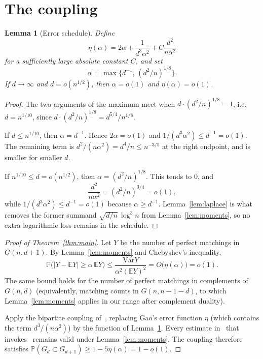 \documentclass[11pt]{article}
\newtheorem{lemma}[theorem]{Lemma}
\newcommand{\Gnd}{G(n,d)}
\newcommand{\EE}{\mathbb{E}}
\newcommand{\PP}{\mathbb{P}}
\newcommand{\Var}{\mathrm{Var}}
\begin{document}
\section{The coupling}
\label{sec:coupling}

\begin{lemma}[Error schedule]
\label{lem:eta}
Define
\[
\eta(\alpha)=2\alpha+\frac1{d^3\alpha^2}+C\frac{d^2}{n\alpha^2}
\]
for a sufficiently large absolute constant \(C\), and set
\[
\alpha=\max\bigl\{d^{-1},\,(d^2/n)^{1/8}\bigr\}.
\]
If \(d\to\infty\) and \(d=o(n^{1/2})\), then \(\alpha=o(1)\) and \(\eta(\alpha)=o(1)\).
\end{lemma}

\begin{proof}
The two arguments of the maximum meet when \(d\cdot(d^2/n)^{1/8}=1\), i.e.\ \(d=n^{1/10}\),
since \(d\cdot(d^2/n)^{1/8}=d^{5/4}/n^{1/8}\).

If \(d\le n^{1/10}\), then \(\alpha=d^{-1}\). Hence \(2\alpha=o(1)\) and
\(1/(d^3\alpha^2)\le d^{-1}=o(1)\). The remaining term is
\(d^2/(n\alpha^2)=d^4/n\le n^{-3/5}\) at the right endpoint, and is smaller for smaller \(d\).

If \(n^{1/10}\le d=o(n^{1/2})\), then \(\alpha=(d^2/n)^{1/8}\). This tends to \(0\), and
\[
\frac{d^2}{n\alpha^2}=(d^2/n)^{3/4}=o(1),
\]
while \(1/(d^3\alpha^2)\le d^{-1}=o(1)\) because \(\alpha\ge d^{-1}\).
Lemma~\ref{lem:laplace} is what removes the former summand \(\sqrt{d/n}\,\log^3 n\) from
Lemma~\ref{lem:moments}, so no extra logarithmic loss remains in the schedule.
\end{proof}

\begin{proof}[Proof of Theorem~\ref{thm:main}]
Let \(Y\) be the number of perfect matchings in \(G(n,d+1)\).
By Lemma~\ref{lem:moments} and Chebyshev's inequality,
\[
\PP\bigl(|Y-\EE Y|\ge\alpha\,\EE Y\bigr)
\le\frac{\Var Y}{\alpha^2(\EE Y)^2}
=O\bigl(\eta(\alpha)\bigr)=o(1).
\]
The same bound holds for the number of perfect matchings in complements of
\(\Gnd\) (equivalently, matching counts in \(G(n,n-1-d)\), to which
Lemma~\ref{lem:moments} applies in our range after complement duality).

Apply the bipartite coupling of~\cite[Theorem~19]{Gao21}, replacing Gao's error
function \(\eta\) (which contains the term \(d^3/(n\alpha^2)\)) by the function of
Lemma~\ref{lem:eta}.
Every estimate in~\cite[§4.2]{Gao21} that invokes~\cite[Theorem~10 or
Corollary~15]{Gao21} remains valid under Lemma~\ref{lem:moments}.
The coupling therefore satisfies
\(\PP(G_d\subset G_{d+1})\ge 1-5\eta(\alpha)=1-o(1)\).
\end{proof}
\end{document}
